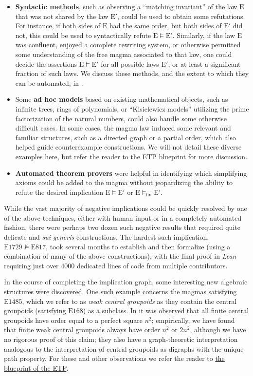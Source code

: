 \documentclass[12pt]{amsart}
\theoremstyle{definition}
\newcommand{\nmodels}{\not\models}
\newcommand{\modelsfin}{\models_{\mathrm{fin}}}
\newcommand{\Eq}[1]{\mathrm{E}#1}
\newcommand{\E}{\mathrm{E}}
\begin{document}
\begin{itemize}
        \item \textbf{Syntactic methods}, such as observing a ``matching invariant'' of the law $\E$ that was not shared by the law ${\E'}$, could be used to obtain some refutations.  For instance, if both sides of $\E$ had the same order, but both sides of ${\E'}$ did not, this could be used to syntactically refute ${\E} \models {\E'}$.  Similarly, if the law $\E$ was confluent, enjoyed a complete rewriting system, or otherwise permitted some understanding of the free magma associated to that law, one could decide the assertions ${\E} \models {\E'}$ for all possible laws ${\E'}$, or at least a significant fraction of such laws.  We discuss these methods, and the extent to which they can be automated, in .
        \item Some \textbf{ad hoc models} based on existing mathematical objects, such as infinite trees, rings of polynomials, or ``Kisielewicz models'' utilizing the prime factorization of the natural numbers, could also handle some otherwise difficult cases.  In some cases, the magma law induced some relevant and familiar structures, such as a directed graph or a partial order, which also helped guide counterexample constructions. We will not detail these diverse examples here, but refer the reader to the ETP blueprint for more discussion.
        \item \textbf{Automated theorem provers} were helpful in identifying which simplifying axioms could be added to the magma without jeopardizing the ability to refute the desired implication ${\E} \models {\E'}$ or ${\E} \modelsfin {\E'}$.
\end{itemize}

While the vast majority of negative implications could be quickly resolved by one of the above techniques, either with human input or in a completely automated fashion, there were perhaps two dozen such negative results that required quite delicate and \emph{sui generis} constructions.  The hardest such implication, $\Eq{1729} \nmodels \Eq{817}$, took several months to establish and then formalize (using a combination of many of the above constructions), with the final proof in \emph{Lean} requiring just over $\num{4000}$ dedicated lines of code from multiple contributors.

In the course of completing the implication graph, some interesting new algebraic structures were discovered.  One such example concerns the magmas satisfying $\Eq{1485}$, which we refer to as \emph{weak central groupoids} as they contain the central groupoids (satisfying $\Eq{168}$) as a subclass.  In \cite{knuth} it was observed that all finite central groupoids have order equal to a perfect square $n^2$; empirically, we have found that finite weak central groupoids always have order $n^2$ or $2n^2$, although we have no rigorous proof of this claim; they also have a graph-theoretic interpretation analogous to the interpretation of central groupoids as digraphs with the unique path property.  For these and other observations we refer the reader to \href{https://teorth.github.io/equational_theories/blueprint/weak-central-groupoids-chapter.html}{the blueprint of the ETP}.
\end{document}
